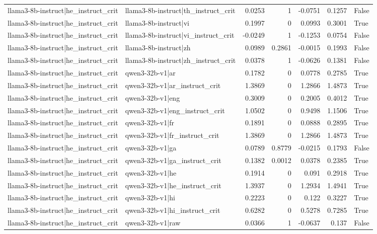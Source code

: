 \begin{table}
\begin{tabular}{l l r r r r l}
llama3-8b-instruct|he_instruct_crit & llama3-8b-instruct|th_instruct_crit & 0.0253 & 1 & -0.0751 & 0.1257 & False \\
llama3-8b-instruct|he_instruct_crit & llama3-8b-instruct|vi & 0.1997 & 0 & 0.0993 & 0.3001 & True \\
llama3-8b-instruct|he_instruct_crit & llama3-8b-instruct|vi_instruct_crit & -0.0249 & 1 & -0.1253 & 0.0754 & False \\
llama3-8b-instruct|he_instruct_crit & llama3-8b-instruct|zh & 0.0989 & 0.2861 & -0.0015 & 0.1993 & False \\
llama3-8b-instruct|he_instruct_crit & llama3-8b-instruct|zh_instruct_crit & 0.0378 & 1 & -0.0626 & 0.1381 & False \\
llama3-8b-instruct|he_instruct_crit & qwen3-32b-v1|ar & 0.1782 & 0 & 0.0778 & 0.2785 & True \\
llama3-8b-instruct|he_instruct_crit & qwen3-32b-v1|ar_instruct_crit & 1.3869 & 0 & 1.2866 & 1.4873 & True \\
llama3-8b-instruct|he_instruct_crit & qwen3-32b-v1|eng & 0.3009 & 0 & 0.2005 & 0.4012 & True \\
llama3-8b-instruct|he_instruct_crit & qwen3-32b-v1|eng_instruct_crit & 1.0502 & 0 & 0.9498 & 1.1506 & True \\
llama3-8b-instruct|he_instruct_crit & qwen3-32b-v1|fr & 0.1891 & 0 & 0.0888 & 0.2895 & True \\
llama3-8b-instruct|he_instruct_crit & qwen3-32b-v1|fr_instruct_crit & 1.3869 & 0 & 1.2866 & 1.4873 & True \\
llama3-8b-instruct|he_instruct_crit & qwen3-32b-v1|ga & 0.0789 & 0.8779 & -0.0215 & 0.1793 & False \\
llama3-8b-instruct|he_instruct_crit & qwen3-32b-v1|ga_instruct_crit & 0.1382 & 0.0012 & 0.0378 & 0.2385 & True \\
llama3-8b-instruct|he_instruct_crit & qwen3-32b-v1|he & 0.1914 & 0 & 0.091 & 0.2918 & True \\
llama3-8b-instruct|he_instruct_crit & qwen3-32b-v1|he_instruct_crit & 1.3937 & 0 & 1.2934 & 1.4941 & True \\
llama3-8b-instruct|he_instruct_crit & qwen3-32b-v1|hi & 0.2223 & 0 & 0.122 & 0.3227 & True \\
llama3-8b-instruct|he_instruct_crit & qwen3-32b-v1|hi_instruct_crit & 0.6282 & 0 & 0.5278 & 0.7285 & True \\
llama3-8b-instruct|he_instruct_crit & qwen3-32b-v1|raw & 0.0366 & 1 & -0.0637 & 0.137 & False \\

\end{tabular}
\end{table}
